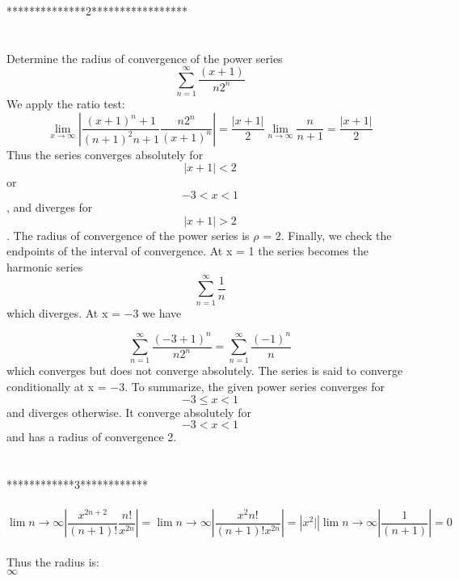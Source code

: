 \documentclass[onecolumn]{IEEEtran}
\begin{document}
\\
\\
\\
**************2***************** 
\\
\\
\\Determine the radius of convergence of the power series
\begin{equation}
    \sum_{n=1}^{\infty}\frac{(x+1)}{n2^n}
    \label{sum}
\end{equation}
We apply the ratio test:
\begin{equation}
  \lim_{x\to\infty}\left|\frac{(x+1)^n+1}{(n+1)^2n+1}\frac{n2^n}{(x+1)^n}  \right| \label{limits} =\frac{
  \left|x+1\right|}{2}\lim_{n\to\infty}\frac{n}{n+1} \label{limits}=\frac{\left|x+1\right|}{2}
    \label{limits}
\end{equation}
Thus the series converges absolutely for 
    \begin{equation}
    \left| x + 1\right| < 2
    \end{equation}
 or   \begin{equation}
  −3 < x < 1
    \end{equation}
 , and diverges for
   \begin{equation}
    \left| x + 1\right| > 2
    \end{equation}. The radius of convergence of the power series is $\rho$ = 2. Finally, we check the
endpoints of the interval of convergence. At x = 1 the series becomes the harmonic series
\begin{equation}
     \sum_{n=1}^{\infty}\frac{1}{n}
    \end{equation}
    which diverges. At x = −3 we have
    
 \begin{equation}
     \sum_{n=1}^{\infty}\frac{(-3+1)^n}{n2^n}= \sum_{n=1}^{\infty}\frac{(-1)^n}{n}
    \end{equation}
    which converges but does not converge absolutely. The series is said to converge conditionally at x = −3. To summarize, the given power series converges for \begin{equation} −3 ≤ x < 1 \end{equation}and diverges otherwise. It converge absolutely for  \begin{equation} −3 < x < 1 \end{equation}and has a radius of convergence 2.\\
    \\
    \\
 ************3************
 \\
 \\
 \begin{equation}
     \lim{n\to \infty}\left|\frac{x^{2n+2}}{(n+1)!}\frac{n!}{x^{2n}}\right|=\lim{n\to \infty}\left|\frac{x^{2}n!}{(n+1)!x^{2n}}\right|=\left|x^2|\right|\lim{n\to \infty}\left|\frac{1}{(n+1)}\right|=0
 \end{equation}
 \\
 Thus the radius is: \\
 $\infty$
 
\end{document}
